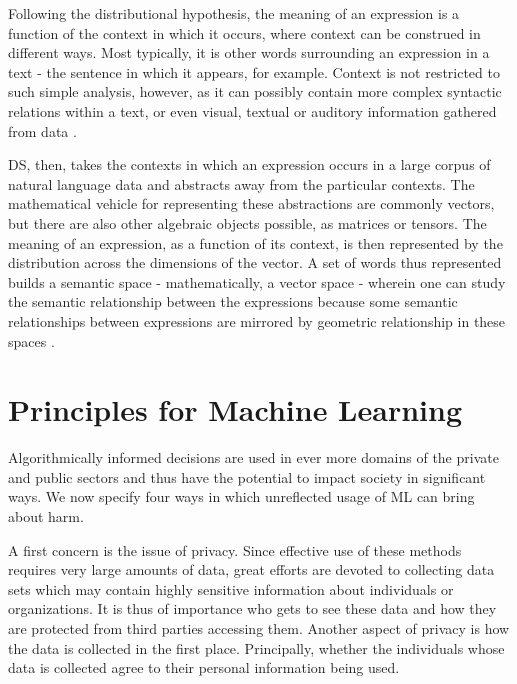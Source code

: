 \documentclass{article}
\begin{document}
Following the distributional hypothesis, the meaning of an expression is a function of the context in which it occurs, where context can be construed in different ways. Most typically, it is other words surrounding an expression in a text - the sentence in which it appears, for example. Context is not restricted to such simple analysis, however, as it can possibly contain more complex syntactic relations within a text, or even visual, textual or auditory information gathered from data \cite{erk2012vector}.

DS, then, takes the contexts in which an expression occurs in a large corpus of natural language data and abstracts away from the particular contexts. The mathematical vehicle for representing these abstractions are commonly vectors, but there are also other algebraic objects possible, as matrices or tensors. The meaning of an expression, as a function of its context, is then represented by the distribution across the dimensions of the vector. A set of words thus represented builds a semantic space - mathematically, a vector space - wherein one can study the semantic relationship between the expressions because some semantic relationships between expressions are mirrored by geometric relationship in these spaces \cite{boleda2016formal}.

\section{Principles for Machine Learning}\hypertarget{sec3}{}
Algorithmically informed decisions are used in ever more domains of the private and public sectors and thus have the potential to impact society in significant ways. We now specify four ways in which unreflected usage of ML can bring about harm.

A first concern is the issue of privacy. Since effective use of these methods requires very large amounts of data, great efforts are devoted to collecting data sets which may contain highly sensitive information about individuals or organizations. It is thus of importance who gets to see these data and how they are protected from third parties accessing them. 
Another aspect of privacy is how the data is collected in the first place. Principally, whether the individuals whose data is collected agree to their personal information being used.
\end{document}
